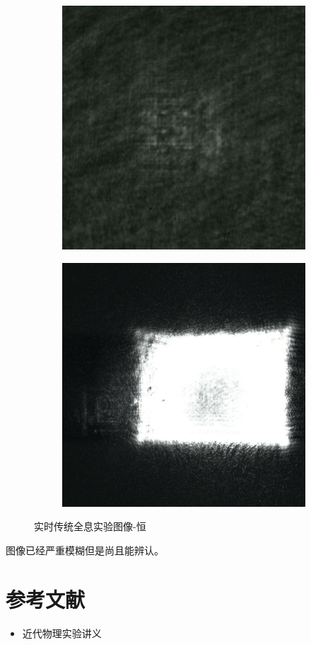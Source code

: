 \documentclass{ctexart}
\begin{document}
\begin{figure}[H]
  \centering
  \begin{subfigure}{.48\textwidth}
    \includegraphics[width=\linewidth]{数字全息实验数据/数字全息/恒/恒.jpg}
  \end{subfigure}
  \begin{subfigure}{.48\textwidth}
    \includegraphics[width=\linewidth]{数字全息实验数据/实时传统全息/恒结果.jpg}
  \end{subfigure}
  \caption{实时传统全息实验图像-恒}
\end{figure}

图像已经严重模糊但是尚且能辨认。

\section{参考文献}
\begin{itemize}[leftmargin=0pt]
  \item[] 近代物理实验讲义
\end{itemize}
\end{document}
